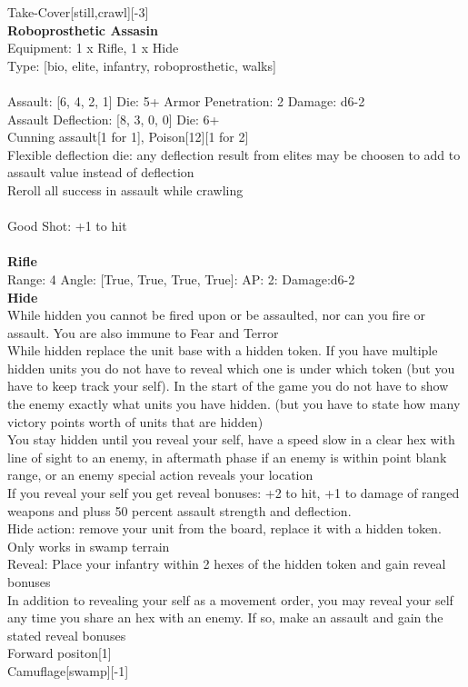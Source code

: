 \noindent Take-Cover[still,crawl][-3]\\ 


{\bf Roboprosthetic Assasin } \\
Equipment: 1 x Rifle, 1 x Hide \\
Type: [bio, elite, infantry, roboprosthetic, walks] \\
\ \\
Assault: [6, 4, 2, 1] Die: 5+ Armor Penetration: 2 Damage: d6-2 \\
Assault Deflection: [8, 3, 0, 0] Die: 6+\\
\indent Cunning assault[1 for 1], Poison[12][1 for 2]\\ 
Flexible deflection die: any deflection result from elites may be choosen to add to assault value instead of deflection\\ 
Reroll all success in assault while crawling\\ 
 
\ \\
Good Shot: +1 to hit\\ 

\ \\
{\bf Rifle } \\



Range: 4  Angle: [True, True, True, True]: AP: 2: Damage:d6-2 \\




{\bf Hide } \\

While hidden you cannot be fired upon or be assaulted, nor can you fire or assault. You are also immune to Fear and Terror\\ 
While hidden replace the unit base with a hidden token. If you have multiple hidden units you do not have to reveal which one is under which token (but you have to keep track your self). In the start of the game you do not have to show the enemy exactly what units you have hidden. (but you have to state how many victory points worth of units that are hidden)\\ 
You stay hidden until you reveal your self, have a speed slow in a clear hex with line of sight to an enemy, in aftermath phase if an enemy is within point blank range, or an enemy special action reveals your location\\ 
If you reveal your self you get reveal bonuses: +2 to hit, +1 to damage of ranged weapons and pluss 50 percent assault strength and deflection.\\ 
Hide action: remove your unit from the board, replace it with a hidden token. Only works in swamp terrain\\ 
Reveal: Place your infantry within 2 hexes of the hidden token and gain reveal bonuses\\ 
In addition to revealing your self as a movement order, you may reveal your self any time you share an hex with an enemy. If so, make an assault and gain the stated reveal bonuses\\ 
Forward positon[1]\\ 
Camuflage[swamp][-1]\\ 





